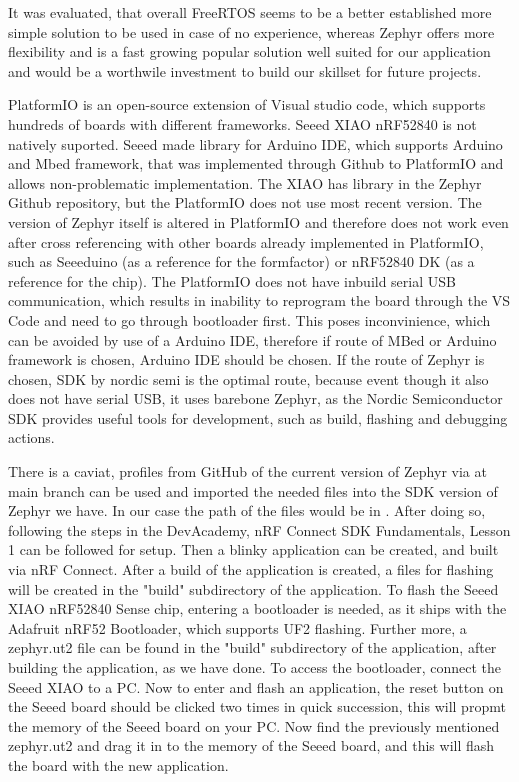 It was evaluated, that overall FreeRTOS seems to be a better established more simple solution to be used in case of no experience, whereas Zephyr offers more flexibility and is a fast growing popular solution well suited for our application and would be a worthwile investment to build our skillset for future projects. \cite{Industry}

PlatformIO is an open-source extension of Visual studio code, which supports hundreds of boards with different frameworks. \cite{Platform} Seeed XIAO nRF52840 is not natively suported. Seeed made library for Arduino IDE, which supports Arduino and Mbed framework, that was implemented through Github to PlatformIO and allows non-problematic implementation.
The XIAO has library in the Zephyr Github repository, but the PlatformIO does not use most recent version. The version of Zephyr itself is altered in PlatformIO and therefore does not work even after cross referencing with other boards already implemented in PlatformIO, such as Seeeduino (as a reference for the formfactor) or nRF52840 DK (as a reference for the chip).
The PlatformIO does not have inbuild serial USB communication, which results in inability to reprogram the board through the VS Code and need to go through bootloader first. This poses inconvinience, which can be avoided by use of a Arduino IDE, therefore if route of MBed or Arduino framework is chosen, Arduino IDE should be chosen. If the route of Zephyr is chosen, SDK by nordic semi is the optimal route, because event though it also does not have serial USB, it uses barebone Zephyr, as the Nordic Semiconductor SDK provides useful tools for development, such as build, flashing and debugging actions. \cite{nRF}

There is a caviat, profiles from GitHub of the current version of Zephyr via  at main branch \cite{gitZephyr} can be used and imported the needed files into the SDK version of Zephyr we have.
In our case the path of the files would be in  .
After doing so, following the steps in the DevAcademy, nRF Connect SDK Fundamentals, Lesson 1 can be followed for setup. Then a blinky application can be created, and built via nRF Connect.
After a build of the application is created, a files for flashing will be created in the "build" subdirectory of the application.
To flash the Seeed XIAO nRF52840 Sense chip, entering a bootloader is needed, as it ships with the Adafruit nRF52 Bootloader, which supports UF2 flashing. \cite{docsZephyr}
Further more, a zephyr.ut2 file can be found in the "build" subdirectory of the application, after building the application, as we have done.
To access the bootloader, connect the Seeed XIAO to a PC.
Now to enter and flash an application, the reset button on the Seeed board should be clicked two times in quick succession, this will propmt the memory of the Seeed board on your PC.
Now find the previously mentioned zephyr.ut2 and drag it in to the memory of the Seeed board, and this will flash the board with the new application.

